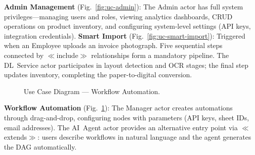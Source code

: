 \documentclass[11pt,a4paper]{report}
\begin{document}
\textbf{Admin Management} (Fig.~\ref{fig:uc-admin}): The Admin actor has full system privileges---managing users and roles, viewing analytics dashboards, CRUD operations on product inventory, and configuring system-level settings (API keys, integration credentials).
\textbf{Smart Import} (Fig.~\ref{fig:uc-smart-import}): Triggered when an Employee uploads an invoice photograph. Five sequential steps connected by $\ll$include$\gg$ relationships form a mandatory pipeline. The DL~Service actor participates in layout detection and OCR stages; the final step updates inventory, completing the paper-to-digital conversion.

\begin{figure}[H]
\centering
{}%
\caption{Use Case Diagram --- Workflow Automation.}
\label{fig:uc-workflow}
\end{figure}

\textbf{Workflow Automation} (Fig.~\ref{fig:uc-workflow}): The Manager actor creates automations through drag-and-drop, configuring nodes with parameters (API keys, sheet IDs, email addresses). The AI~Agent actor provides an alternative entry point via $\ll$extends$\gg$: users describe workflows in natural language and the agent generates the DAG automatically.
\end{document}
